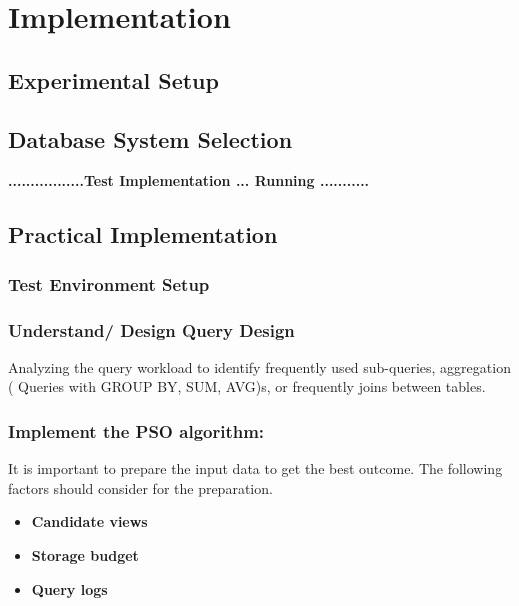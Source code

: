 \section{Implementation}
\subsection{Experimental Setup}
\subsection{Database System Selection}



 \begin{center}
     \textbf{.................Test Implementation ... Running ...........}
 \end{center}

\subsection{Practical Implementation}
\subsubsection{Test Environment Setup }
\subsubsection{Understand/ Design Query Design} Analyzing the query workload to identify frequently used sub-queries, aggregation ( Queries with GROUP BY, SUM, AVG)s, or frequently joins between tables. 
\subsubsection{Implement the PSO algorithm:} It is important to prepare the input data to get the best outcome. The following factors should consider for the preparation. 

  \begin{itemize}
      \item \textbf{Candidate views}
      \item \textbf{Storage budget}
      \item \textbf{Query logs}
  \end{itemize}

